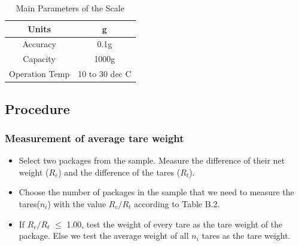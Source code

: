 \documentclass[a4paper]{article}
\begin{document}
\begin{table}[!htbp]
\centering
\begin{tabular}{|c|c|}
\hline
Units&g
\\\hline
Accuracy&0.1g
\\\hline
Capacity&1000g
\\\hline
Operation Temp&10 to 30 dec C
\\\hline
\end{tabular}  
\caption{Main Parameters of the Scale}
\end{table}

\subsection{Procedure}
\subsubsection{Measurement of average tare weight}
\begin{itemize}
\item Select two packages from the sample. Measure the difference of their net weight ($R_c$) and the difference of the tares ($R_t$).
\item Choose the number of packages in the sample that we need to measure the tares($n_i$) with the value $R_c / R_t$ according to Table B.2.
\item If $R_c / R_t$ $\leq$ 1.00, test the weight of every tare as the tare weight of the package. Else we test the average weight of all $n_i$ tares as  the tare weight.
\end{itemize}
\end{document}
